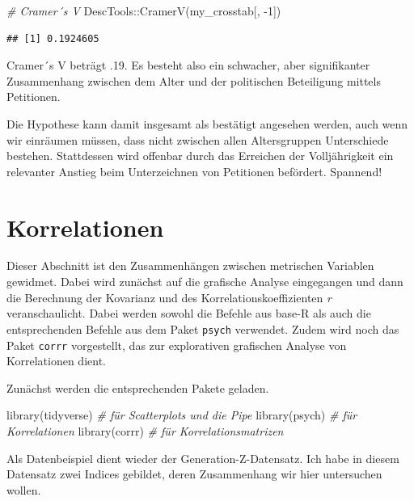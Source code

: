 \documentclass[
]{book}
\newenvironment{Shaded}{\begin{snugshade}}{\end{snugshade}}
\newcommand{\CommentTok}[1]{\textcolor[rgb]{0.56,0.35,0.01}{\textit{#1}}}
\newcommand{\DecValTok}[1]{\textcolor[rgb]{0.00,0.00,0.81}{#1}}
\newcommand{\FunctionTok}[1]{\textcolor[rgb]{0.00,0.00,0.00}{#1}}
\newcommand{\NormalTok}[1]{#1}
\newcommand{\SpecialCharTok}[1]{\textcolor[rgb]{0.00,0.00,0.00}{#1}}
\begin{document}
\begin{Shaded}
\begin{Highlighting}[]
\CommentTok{\# Cramer´s V}
\NormalTok{DescTools}\SpecialCharTok{::}\FunctionTok{CramerV}\NormalTok{(my\_crosstab[, }\SpecialCharTok{{-}}\DecValTok{1}\NormalTok{])}
\end{Highlighting}
\end{Shaded}

\begin{verbatim}
## [1] 0.1924605
\end{verbatim}

Cramer´s V beträgt .19. Es besteht also ein schwacher, aber signifikanter Zusammenhang zwischen dem Alter und der politischen Beteiligung mittels Petitionen.

Die Hypothese kann damit insgesamt als bestätigt angesehen werden, auch wenn wir einräumen müssen, dass nicht zwischen allen Altersgruppen Unterschiede bestehen.
Stattdessen wird offenbar durch das Erreichen der Volljährigkeit ein relevanter Anstieg beim Unterzeichnen von Petitionen befördert. Spannend!

\hypertarget{korrelationen}{%
\section{Korrelationen}\label{korrelationen}}

Dieser Abschnitt ist den Zusammenhängen zwischen metrischen Variablen gewidmet. Dabei wird zunächst auf die grafische Analyse eingegangen und dann die Berechnung der Kovarianz und des Korrelationskoeffizienten \emph{r} veranschaulicht. Dabei werden sowohl die Befehle aus base-R als auch die entsprechenden Befehle aus dem Paket \texttt{psych} verwendet. Zudem wird noch das Paket \texttt{corrr} vorgestellt, das zur explorativen grafischen Analyse von Korrelationen dient.

Zunächst werden die entsprechenden Pakete geladen.

\begin{Shaded}
\begin{Highlighting}[]
\FunctionTok{library}\NormalTok{(tidyverse) }\CommentTok{\# für Scatterplots und die Pipe}
\FunctionTok{library}\NormalTok{(psych)     }\CommentTok{\# für Korrelationen}
\FunctionTok{library}\NormalTok{(corrr)     }\CommentTok{\# für Korrelationsmatrizen}
\end{Highlighting}
\end{Shaded}

Als Datenbeispiel dient wieder der Generation-Z-Datensatz. Ich habe in diesem Datensatz zwei Indices gebildet, deren Zusammenhang wir hier untersuchen wollen.
\end{document}
